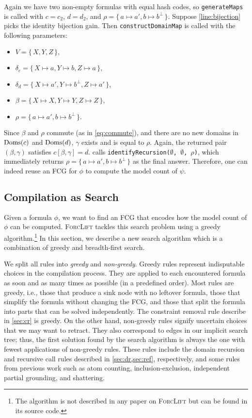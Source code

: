 \begin{example}
Again we have two non-empty formulas with equal hash codes, so \texttt{generateMaps} is called with $c = c_2$, $d = d_2$, and $\rho = \{\, a \mapsto a', b \mapsto b^\bot \,\}$. Suppose \cref{line:bijection} picks the identity bijection gain. Then \texttt{constructDomainMap} is called with the following parameters:
\begin{itemize}
\item $V = \{\, X, Y, Z \,\}$,
\item $\delta_c = \{\, X \mapsto a, Y \mapsto b, Z \mapsto a \,\}$,
\item $\delta_d = \{\, X \mapsto a', Y \mapsto b^\bot, Z \mapsto a' \,\}$,
\item $\beta = \{\, X \mapsto X, Y \mapsto Y, Z \mapsto Z \,\}$,
\item $\rho = \{\, a \mapsto a', b \mapsto b^\bot \,\}$.
\end{itemize}
Since $\beta$ and $\rho$ commute (as in \cref{eq:commute}), and there are no new domains in $\operatorname{Doms}(c)$ and $\operatorname{Doms}(d)$, $\gamma$ exists and is equal to $\rho$. Again, the returned pair $(\beta, \gamma)$ satisfies $c[\beta, \gamma] = d$.  calls \texttt{identifyRecursion($\emptyset$, $\emptyset$, $\rho$)}, which immediately returns $\rho = \{\, a \mapsto a', b \mapsto b^\bot \,\}$ as the final answer. Therefore, one can indeed reuse an FCG for $\phi$ to compute the model count of $\psi$.
\end{example}

\subsection{Compilation as Search}

Given a formula $\phi$, we want to find an FCG that encodes how the model count of $\phi$ can be computed. \textsc{ForcLift} tackles this search problem using a greedy algorithm.\footnote{The algorithm is not described in any paper on \textsc{ForcLift} but can be found in its source code.} In this section, we describe a new search algorithm which is a combination of greedy and breadth-first search.

We split all rules into \emph{greedy} and \emph{non-greedy}. Greedy rules represent indisputable choices in the compilation process. They are applied to each encountered formula as soon and as many times as possible (in a predefined order). Most rules are greedy, i.e., those that produce a sink node with no leftover formula, those that simplify the formula without changing the FCG, and those that split the formula into parts that can be solved independently. The constraint removal rule describe in \cref{sec:cr} is greedy. On the other hand, non-greedy rules signify uncertain choices that we may want to retract. They also correspond to edges in our implicit search tree; thus, the first solution found by the search algorithm is always the one with fewest applications of non-greedy rules. These rules include the domain recursion and recursive call rules described in \cref{sec:dr,sec:ref}, respectively, and some rules from previous work \citep{DBLP:conf/ijcai/BroeckTMDR11} such as atom counting, inclusion-exclusion, independent partial grounding, and shattering.

